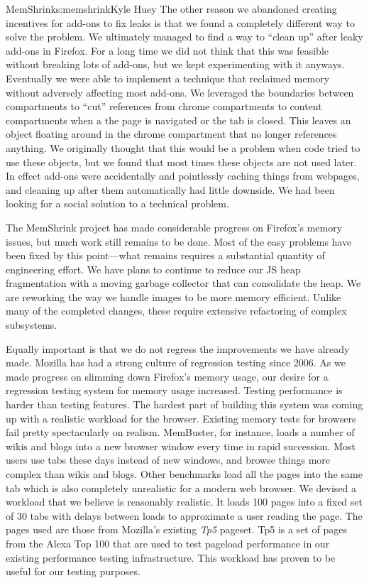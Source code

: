 \begin{aosachapter}{MemShrink}{s:memshrink}{Kyle Huey}
The other reason we abandoned creating incentives for add-ons to fix
leaks is that we found a completely different way to solve the problem.
We ultimately managed to find a way to ``clean up'' after leaky add-ons
in Firefox. For a long time we did not think that this was feasible
without breaking lots of add-ons, but we kept experimenting with it
anyways. Eventually we were able to implement a technique that reclaimed
memory without adversely affecting most add-ons. We leveraged the
boundaries between compartments to ``cut'' references from chrome
compartments to content compartments when a the page is navigated or the
tab is closed. This leaves an object floating around in the chrome
compartment that no longer references anything. We originally thought
that this would be a problem when code tried to use these objects, but
we found that most times these objects are not used later. In effect
add-ons were accidentally and pointlessly caching things from webpages,
and cleaning up after them automatically had little downside. We had
been looking for a social solution to a technical problem.


The MemShrink project has made considerable progress on Firefox's memory
issues, but much work still remains to be done. Most of the easy
problems have been fixed by this point---what remains requires a
substantial quantity of engineering effort. We have plans to continue to
reduce our JS heap fragmentation with a moving garbage collector that
can consolidate the heap. We are reworking the way we handle images to
be more memory efficient. Unlike many of the completed changes, these
require extensive refactoring of complex subsystems.

Equally important is that we do not regress the improvements we have
already made. Mozilla has had a strong culture of regression testing
since 2006. As we made progress on slimming down Firefox's memory usage,
our desire for a regression testing system for memory usage increased.
Testing performance is harder than testing features. The hardest part of
building this system was coming up with a realistic workload for the
browser. Existing memory tests for browsers fail pretty spectacularly on
realism. MemBuster, for instance, loads a number of wikis and blogs into
a new browser window every time in rapid succession. Most users use tabs
these days instead of new windows, and browse things more complex than
wikis and blogs. Other benchmarks load all the pages into the same tab
which is also completely unrealistic for a modern web browser. We
devised a workload that we believe is reasonably realistic. It loads 100
pages into a fixed set of 30 tabs with delays between loads to
approximate a user reading the page. The pages used are those from
Mozilla's existing \emph{Tp5} pageset. Tp5 is a set of pages from the
Alexa Top 100 that are used to test pageload performance in our existing
performance testing infrastructure. This workload has proven to be
useful for our testing purposes.


\end{aosachapter}
